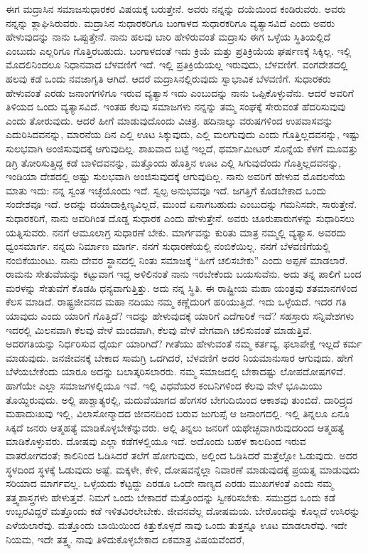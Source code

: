 ಈಗ ಮದ್ರಾಸಿನ ಸಮಾಜಸುಧಾರಕರ ವಿಷಯಕ್ಕೆ ಬರುತ್ತೇನೆ. ಅವರು ನನ್ನನ್ನು ದಯೆಯಿಂದ ಕಂಡಿರುವರು. ಅವರು ನನ್ನನ್ನು ಶ್ಲಾಘಿಸಿರುವರು. ಮದ್ರಾಸಿನ ಸುಧಾರಕರಿಗೂ ಬಂಗಾಳದ ಸುಧಾರಕರಿಗೂ ವ್ಯತ್ಯಾಸವಿದೆ ಎಂದು ಅವರು ಹೇಳುವುದನ್ನು ನಾನು ಒಪ್ಪುತ್ತೇನೆ. ನಾನು ಹಲವು ಬಾರಿ ಹೇಳಿರುವಂತೆ ಮದ್ರಾಸು ಈಗ ಒಳ್ಳೆಯ ಸ್ಥಿತಿಯಲ್ಲಿದೆ ಎಂಬುದು ಎಲ್ಲರಿಗೂ ಗೊತ್ತಿರಬಹುದು. ಬಂಗಾಳದಂತೆ ಇದು ಕ್ರಿಯೆ ಮತ್ತು ಪ್ರತಿಕ್ರಿಯೆಯ ಘರ್ಷಣಕ್ಕೆ ಸಿಕ್ಕಿಲ್ಲ. ಇಲ್ಲಿ ಮೊದಲಿನಿಂದಲೂ ನಿಧಾನವಾದ ಬೆಳವಣಿಗೆ ಇದೆ. ಇಲ್ಲಿ ಪ್ರತಿಕ್ರಿಯೆಯಲ್ಲ ಇರುವುದು, ಬೆಳವಣಿಗೆ. ವಂಗದೇಶದಲ್ಲಿ ಹಲವು ಕಡೆ ಒಂದು ನವಜಾಗೃತಿ ಆಗಿದೆ. ಆದರೆ ಮದ್ರಾಸಿನಲ್ಲಿರುವುದು ಸ್ವಾಭಾವಿಕ ಬೆಳವಣಿಗೆ. ಸುಧಾರಕರು ಹೇಳುವಂತೆ ಎರಡು ಜನಾಂಗಗಳಿಗೂ ಇರುವ ವ್ಯತ್ಯಾಸ ಇದು ಎಂಬುದನ್ನು ನಾನು ಒಪ್ಪಿಕೊಳ್ಳುವೆನು. ಆದರೆ ಅವರಿಗೆ ತಿಳಿಯದ ಒಂದು ವ್ಯತ್ಯಾಸವಿದೆ. ಇಂತಹ ಕೆಲವು ಸಮಾಜಗಳು ನನ್ನನ್ನು ತಮ್ಮ ಸಂಘಕ್ಕೆ ಸೇರುವಂತೆ ಹೆದರಿಸುವುವು ಎಂದು ತೋರುವುದು. ಆದರೆ ಹೀಗೆ ಮಾಡುವುದೊಂದು ವಿಚಿತ್ರ. ಹದಿನಾಲ್ಕು ವರುಷಗಳಿಂದ ಉಪವಾಸವನ್ನು ಎದುರಿಸಿದವನನ್ನು, ಮಾರನೆಯ ದಿನ ಎಲ್ಲಿ ಊಟ ಸಿಕ್ಕುವುದು, ಎಲ್ಲಿ ಮಲಗುವುದು ಎಂದು ಗೊತ್ತಿಲ್ಲದವನನ್ನು, ಇಷ್ಟು ಸುಲಭವಾಗಿ ಅಂಜಿಸುವುದಕ್ಕೆ ಆಗುವುದಿಲ್ಲ. ಶಾಖವಾದ ಬಟ್ಟೆ ಇಲ್ಲದೆ, ಥರ್ಮಾಮೀಟರ್​ ಸೊನ್ನೆಯ ಕೆಳಗೆ ಮೂವತ್ತು ಡಿಗ್ರಿ ತೋರಿಸುತ್ತಿದ್ದ ಕಡೆ ಬಾಳಿದವನನ್ನು, ಮತ್ತೊಂದು ಹೊತ್ತಿನ ಊಟ ಎಲ್ಲಿ ಸಿಗುವುದೆಂದು ಗೊತ್ತಿಲ್ಲದವನನ್ನು, ಇಂಡಿಯಾ ದೇಶದಲ್ಲಿ ಅಷ್ಟು ಸುಲಭವಾಗಿ ಅಂಜಿಸುವುದಕ್ಕೆ ಆಗುವುದಿಲ್ಲ. ನಾನು ಅವರಿಗೆ ಹೇಳುವ ಮೊದಲನೆಯ ಮಾತು ಇದು: ನನ್ನ ಸ್ವಂತ ಇಚ್ಛೆಯೊಂದು ಇದೆ. ಸ್ವಲ್ಪ ಅನುಭವವೂ ಇದೆ. ಜಗತ್ತಿಗೆ ಕೊಡಬೇಕಾದ ಒಂದು ಸಂದೇಶವೂ ಇದೆ. ಅದನ್ನು ದಯಾದಾಕ್ಷಿಣ್ಯವಿಲ್ಲದೆ, ಮುಂದೆ ಏನಾಗಬಹುದು ಎಂಬುದನ್ನು ಗಮನಿಸದೇ, ಸಾರುತ್ತೇನೆ. ಸುಧಾರಕರಿಗೆ, ನಾನು ಅವರಿಗಿಂತ ದೊಡ್ಡ ಸುಧಾರಕ ಎಂದು ಹೇಳುತ್ತೇನೆ. ಅವರು ಚೂರುಪಾರುಗಳನ್ನು ಸುಧಾರಿಸಲು ಯತ್ನಿಸುವರು. ನನಗೆ ಆಮೂಲಾಗ್ರ ಸುಧಾರಣೆ ಬೇಕು. ಮಾರ್ಗವನ್ನು ಕುರಿತು ಮಾತ್ರ ನಮ್ಮಲ್ಲಿ ವ್ಯತ್ಯಾಸ. ಅವರದು ಧ್ವಂಸಮಾರ್ಗ. ನನ್ನದು ನಿರ್ಮಾಣ ಮಾರ್ಗ. ನನಗೆ ಸುಧಾರಣೆಯಲ್ಲಿ ನಂಬಿಕೆಯಿಲ್ಲ. ನನಗೆ ಬೆಳವಣಿಗೆಯಲ್ಲಿ ನಂಬಿಕೆಯುಂಟು. ನಾನು ದೇವರ ಸ್ಥಾನದಲ್ಲಿ ನಿಂತು ಸಮಾಜಕ್ಕೆ “ಹೀಗೆ ಚಲಿಸಬೇಕು” ಎಂದು ಅಪ್ಪಣೆ ಮಾಡಲಾರೆ. ರಾಮನು ಸೇತುವೆಯನ್ನು ಕಟ್ಟುವಾಗ ಇದ್ದ ಅಳಿಲಿನಂತೆ ನಾನು ಇರಬೇಕೆಂದು ಬಯಸುವೆನು. ಅದು ತನ್ನ ಪಾಲಿಗೆ ಬಂದ ಮರಳನ್ನು ಸೇತುವೆಗೆ ಕೊಡಹಿ ಧನ್ಯವಾಗುತ್ತಿತ್ತು. ಅದು ನನ್ನ ಸ್ಥಿತಿ. ಈ ರಾಷ್ಟ್ರೀಯ ಮಹಾ ಯಂತ್ರವು ಶತಮಾನಗಳಿಂದ ಕೆಲಸ ಮಾಡಿದೆ. ರಾಷ್ಟ್ರಜೀವನದ ಮಹಾ ನದಿಯು ನಮ್ಮ ಕಣ್ಣೆದುರಿಗೆ ಹರಿಯುತ್ತಿದೆ. ಇದು ಒಳ್ಳೆಯದೆ. ಇದರ ಗತಿ ಯಾವುದು ಎಂದು ಯಾರಿಗೆ ಗೊತ್ತಿದೆ? ಇದನ್ನು ಹೇಳುವುದಕ್ಕೆ ಯಾರಿಗೆ ಎದೆಗಾರಿಕೆ ಇದೆ? ಸಹಸ್ರಾರು ಸನ್ನಿವೇಶಗಳು ಇದರಲ್ಲಿ ಮಿಲನವಾಗಿ ಕೆಲವು ವೇಳೆ ಮಂದವಾಗಿ, ಕೆಲವು ವೇಳೆ ವೇಗವಾಗಿ ಚಲಿಸುವಂತೆ ಮಾಡುತ್ತಿವೆ. ಅದರಗತಿಯನ್ನು ನಿರ್ಧರಿಸುವ ಧೈರ್ಯ ಯಾರಿಗಿದೆ? ಗೀತೆಯು ಹೇಳುವಂತೆ ನಮ್ಮ ಕರ್ತವ್ಯ, ಫಲಾಪೇಕ್ಷೆ ಇಲ್ಲದೆ ಕರ್ಮ ಮಾಡುವುದು. ಜನಜೀವನಕ್ಕೆ ಬೇಕಾದ ಸಾಮಗ್ರಿ ಒದಗಿದರೆ, ಬೆಳವಣಿಗೆ ಅದರ ನಿಯಮಾನುಸಾರ ಆಗುವುದು. ಹೇಗೆ ಬೆಳೆಯಬೇಕೆಂದು ಯಾರೂ ಅದನ್ನು ಬಲಾತ್ಕರಿಸಲಾರರು. ನಮ್ಮ ಸಮಾಜದಲ್ಲಿ ಬೇಕಾದಷ್ಟು ಲೋಪದೋಷಗಳಿವೆ. ಹಾಗೆಯೇ ಎಲ್ಲಾ ಸಮಾಜಗಳಲ್ಲಿಯೂ ಇವೆ. ಇಲ್ಲಿ ವಿಧವೆಯರ ಕಂಬನಿಗಳಿಂದ ಕೆಲವು ವೇಳೆ ಭೂಮಿಯು ತೊಯ್ದಿರುವುದು. ಅಲ್ಲಿ ಪಾಶ್ಚಾತ್ಯರಲ್ಲಿ, ಮದುವೆಯಾಗದ ಹೆಂಗಸರ ಬೇಗುದಿಯಿಂದ ಆಕಾಶವು ತುಂಬಿದೆ. ದಾರಿದ್ರ್ಯದ ಮಹಾದುಃಖವು ಇಲ್ಲಿ, ವಿಲಾಸೋನ್ಮಾದದ ಜೀವನದಿಂದ ಬರುವ ಜುಗುಪ್ಸೆ ಆ ಜನಾಂಗದಲ್ಲಿ. ಇಲ್ಲಿ ತಿನ್ನಲೂ ಏನೂ ಸಿಕ್ಕದೆ ಜನರು ಆತ್ಮಹತ್ಯೆ ಮಾಡಿಕೊಳ್ಳಬೇಕೆನ್ನುವರು. ಅಲ್ಲಿ ತಿನ್ನಲು ಜನರಿಗೆ ಯಥೇಚ್ಛವಾಗಿರುವುದರಿಂದ ಆತ್ಮಹತ್ಯೆ ಮಾಡಿಕೊಳ್ಳುವರು. ದೋಷವು ಎಲ್ಲಾ ಕಡೆಗಳಲ್ಲಿಯೂ ಇದೆ. ಅದೊಂದು ಬಹಳ ಕಾಲದಿಂದ ಇರುವ ವಾತರೋಗದಂತೆ; ಕಾಲಿನಿಂದ ಓಡಿಸಿದರೆ ತಲೆಗೆ ಹೋಗುವುದು, ಅಲ್ಲಿಂದ ಓಡಿಸಿದರೆ ಮತ್ತೆಲ್ಲೋ ಓಡುವುದು. ಅದರ ಸ್ಥಳದಿಂದ ಸ್ಥಳಕ್ಕೆ ಓಡುವುದು ಅಷ್ಟೆ. ಮಕ್ಕಳೇ, ಕೇಳಿ, ದೋಷವನ್ನೆಲ್ಲಾ ನಿವಾರಣೆ ಮಾಡುವುದಕ್ಕೆ ಪ್ರಯತ್ನ ಮಾಡುವುದು ಸರಿಯಾದ ಮಾರ್ಗವಲ್ಲ. ಒಳ್ಳೆಯದು ಕೆಟ್ಟದ್ದು ಎರಡೂ ಒಂದೇ ನಾಣ್ಯದ ಎರಡು ಮುಖಗಳಂತೆ ಎಂದು ನಮ್ಮ ತತ್ತ್ವಶಾಸ್ತ್ರಗಳು ಹೇಳುತ್ತವೆ. ನಿಮಗೆ ಒಂದು ಬೇಕಾದರೆ ಮತ್ತೊಂದನ್ನು ಸ್ವೀಕರಿಸಬೇಕು. ಸಮುದ್ರದ ಒಂದು ಕಡೆ ಉಬ್ಬರವಿದ್ದರೆ ಮತ್ತೊಂದು ಕಡೆ ಇಳಿತವಿರಲೇಬೇಕು. ಜೀವನವೆಲ್ಲ ದೋಷಮಯ. ಬೇರೊಂದನ್ನು ಕೊಲ್ಲದೆ ಉಸಿರನ್ನು ಎಳೆಯಲಾರೆವು. ಮತ್ತೊಂದು ಬಾಯಿಯಿಂದ ಕಿತ್ತುಕೊಳ್ಳದೆ ನಾವು ಒಂದು ತುತ್ತನ್ನೂ ಊಟ ಮಾಡಲಾರೆವು. ಇದೇ ನಿಯಮ, ಇದೇ ತತ್ತ್ವ. ನಾವು ತಿಳಿದುಕೊಳ್ಳಬೇಕಾದ ಏಕಮಾತ್ರ ವಿಷಯವೆಂದರೆ, 
